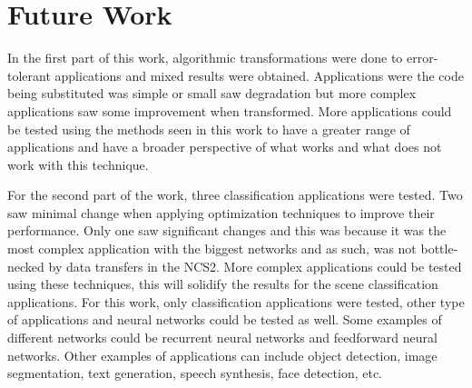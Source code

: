 \section{Future Work}

In the first part of this work, algorithmic transformations were done to error-tolerant applications and mixed results were obtained. Applications were the code being substituted was simple or small saw degradation but more complex applications saw some improvement when transformed. More applications could be tested using the methods seen in this work to have a greater range of applications and have a broader perspective of what works and what does not work with this technique.

For the second part of the work, three classification applications were tested. Two saw minimal change when applying optimization techniques to improve their performance. Only one saw significant changes and this was because it was the most complex application with the biggest networks and as such, was not bottle-necked by data transfers in the NCS2. More complex applications could be tested using these techniques, this will solidify the results for the scene classification applications. For this work, only classification applications were tested, other type of applications and neural networks could be tested as well. Some examples of different networks could be recurrent neural networks and feedforward neural networks. Other examples of applications can include object detection, image segmentation, text generation, speech synthesis, face detection, etc.
